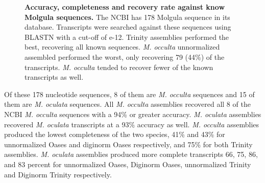 \begin{figure}[!ht]
	\hfill
	\caption{\textbf{Accuracy, completeness and recovery rate against know Molgula sequences.} The NCBI has 178 Molgula sequence in its database. Transcripts were searched against these sequences using BLASTN with a cut-off of e-12. Trinity assemblies performed the best, recovering all known sequences. \textit{M. occulta} unnormalized assembled performed the worst, only recovering 79 (44\%) of the transcripts. \textit{M. occulta} tended to recover fewer of the known transcripts as well.}
	\label{fig:known_molg}
\end{figure}
     
Of these 178 nucleotide sequences, 8 of them are \textit{M. occulta} sequences and 15 of them are \textit{M. oculata} sequences. All \textit{M. occulta} assemblies recovered all 8 of the NCBI \textit{M. occulta} sequences with a 94\% or greater accuracy. \textit{M. oculata} assemblies recovered \textit{M. oculata} transcripts at a 93\% accuracy as well. \textit{M. occulta} assemblies produced the lowest completeness of the two species, 41\% and 43\% for unnormalized Oases and diginorm Oases respectively, and 75\% for both Trinity assemblies. \textit{M. oculata} assemblies produced more complete transcripts 66, 75, 86, and 83 percent for unnormalized Oases, Diginorm Oases, unnormalized Trinity and Diginorm Trinity respectively.


